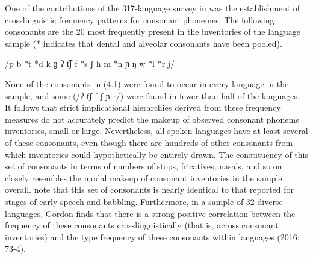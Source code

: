   One of the contributions of the 317-language survey in \citet{Maddieson1984} was the establishment of crosslinguistic frequency patterns for consonant phonemes. The following consonants are the 20 most frequently present in the inventories of the language sample (* indicates that dental and alveolar consonants have been pooled).



\ea\label{ex:(4.1)}
  /p b *t *d k ɡ ʔ t͡ʃ f *s ʃ h m *n ɲ ŋ w *l *r j/



\citep[12]{Maddieson1984}
\z



None of the consonants in (4.1) were found to occur in every language in the sample, and some (/ʔ t͡ʃ f ʃ ɲ r/) were found in fewer than half of the languages. It follows that strict implicational hierarchies derived from these frequency measures do not accurately predict the makeup of observed consonant phoneme inventories, small or large. Nevertheless, all spoken languages have at least several of these consonants, even though there are hundreds of other consonants from which inventories could hypothetically be entirely drawn. The constituency of this set of consonants in terms of numbers of stops, fricatives, nasals, and so on closely resembles the modal makeup of consonant inventories in the sample overall. \citet{LindblomMaddieson1988} note that this set of consonants is nearly identical to that reported for stages of early speech and babbling. Furthermore, in a sample of 32 diverse languages, Gordon finds that there is a strong positive correlation between the frequency of these consonants crosslinguistically (that is, across consonant inventories) and the type frequency of these consonants within languages (2016: 73-4).



